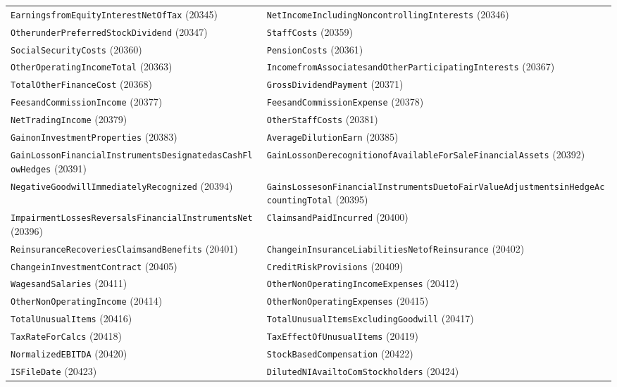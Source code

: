 \documentclass[11pt,a4paper]{report}
\begin{document}
\begin{subappendices}
{\begin{longtable}{@{}p{}p{}@{}}
\texttt{EarningsfromEquityInterestNetOfTax} (20345) & \texttt{NetIncomeIncludingNoncontrollingInterests} (20346) \\
\texttt{OtherunderPreferredStockDividend} (20347) & \texttt{StaffCosts} (20359) \\
\texttt{SocialSecurityCosts} (20360) & \texttt{PensionCosts} (20361) \\
\texttt{OtherOperatingIncomeTotal} (20363) & \texttt{IncomefromAssociatesandOtherParticipatingInterests} (20367) \\
\texttt{TotalOtherFinanceCost} (20368) & \texttt{GrossDividendPayment} (20371) \\
\texttt{FeesandCommissionIncome} (20377) & \texttt{FeesandCommissionExpense} (20378) \\
\texttt{NetTradingIncome} (20379) & \texttt{OtherStaffCosts} (20381) \\
\texttt{GainonInvestmentProperties} (20383) & \texttt{AverageDilutionEarn} (20385) \\
\texttt{GainLossonFinancialInstrumentsDesignatedasCashFlowHedges} (20391) & \texttt{GainLossonDerecognitionofAvailableForSaleFinancialAssets} (20392) \\
\texttt{NegativeGoodwillImmediatelyRecognized} (20394) & \texttt{GainsLossesonFinancialInstrumentsDuetoFairValueAdjustmentsinHedgeAccountingTotal} (20395) \\
\texttt{ImpairmentLossesReversalsFinancialInstrumentsNet} (20396) & \texttt{ClaimsandPaidIncurred} (20400) \\
\texttt{ReinsuranceRecoveriesClaimsandBenefits} (20401) & \texttt{ChangeinInsuranceLiabilitiesNetofReinsurance} (20402) \\
\texttt{ChangeinInvestmentContract} (20405) & \texttt{CreditRiskProvisions} (20409) \\
\texttt{WagesandSalaries} (20411) & \texttt{OtherNonOperatingIncomeExpenses} (20412) \\
\texttt{OtherNonOperatingIncome} (20414) & \texttt{OtherNonOperatingExpenses} (20415) \\
\texttt{TotalUnusualItems} (20416) & \texttt{TotalUnusualItemsExcludingGoodwill} (20417) \\
\texttt{TaxRateForCalcs} (20418) & \texttt{TaxEffectOfUnusualItems} (20419) \\
\texttt{NormalizedEBITDA} (20420) & \texttt{StockBasedCompensation} (20422) \\
\texttt{ISFileDate} (20423) & \texttt{DilutedNIAvailtoComStockholders} (20424) \\

\end{longtable}}
\end{subappendices}
\end{document}
